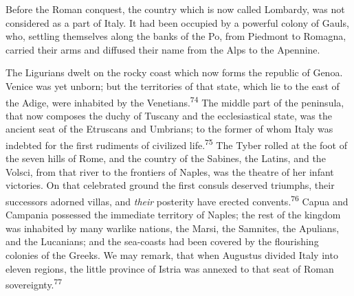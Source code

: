 Before the Roman conquest, the country which is now called
Lombardy, was not considered as a part of Italy. It had been
occupied by a powerful colony of Gauls, who, settling themselves
along the banks of the Po, from Piedmont to Romagna, carried
their arms and diffused their name from the Alps to the Apennine.

The Ligurians dwelt on the rocky coast which now forms the
republic of Genoa. Venice was yet unborn; but the territories of
that state, which lie to the east of the Adige, were inhabited by
the Venetians.\textsuperscript{74} The middle part of the peninsula, that now
composes the duchy of Tuscany and the ecclesiastical state, was
the ancient seat of the Etruscans and Umbrians; to the former of
whom Italy was indebted for the first rudiments of civilized
life.\textsuperscript{75} The Tyber rolled at the foot of the seven hills of Rome,
and the country of the Sabines, the Latins, and the Volsci, from
that river to the frontiers of Naples, was the theatre of her
infant victories. On that celebrated ground the first consuls
deserved triumphs, their successors adorned villas, and \textit{their}
posterity have erected convents.\textsuperscript{76} Capua and Campania possessed
the immediate territory of Naples; the rest of the kingdom was
inhabited by many warlike nations, the Marsi, the Samnites, the
Apulians, and the Lucanians; and the sea-coasts had been covered
by the flourishing colonies of the Greeks. We may remark, that
when Augustus divided Italy into eleven regions, the little
province of Istria was annexed to that seat of Roman sovereignty.\textsuperscript{77}






